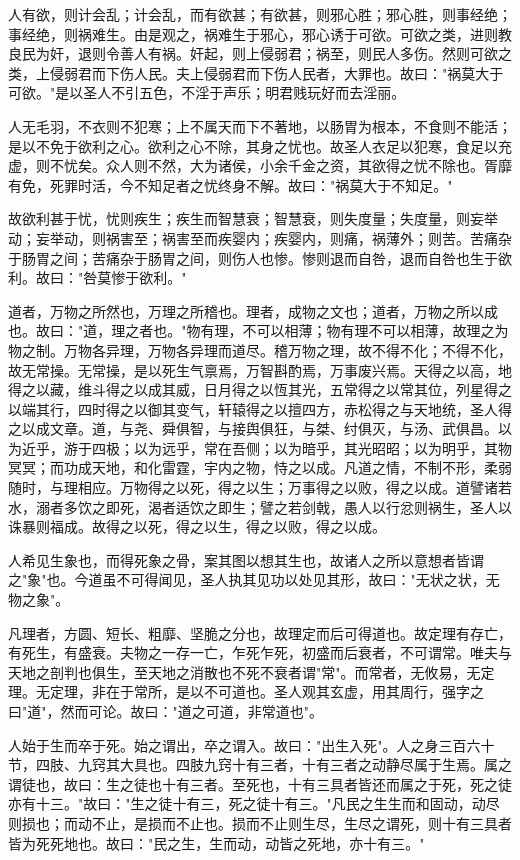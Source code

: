 \documentclass[]{article}
\begin{document}
人有欲，则计会乱；计会乱，而有欲甚；有欲甚，则邪心胜；邪心胜，则事经绝；事经绝，则祸难生。由是观之，祸难生于邪心，邪心诱于可欲。可欲之类，进则教良民为奸，退则令善人有祸。奸起，则上侵弱君；祸至，则民人多伤。然则可欲之类，上侵弱君而下伤人民。夫上侵弱君而下伤人民者，大罪也。故曰："祸莫大于可欲。"是以圣人不引五色，不淫于声乐；明君贱玩好而去淫丽。

人无毛羽，不衣则不犯寒；上不属天而下不著地，以肠胃为根本，不食则不能活；是以不免于欲利之心。欲利之心不除，其身之忧也。故圣人衣足以犯寒，食足以充虚，则不忧矣。众人则不然，大为诸侯，小余千金之资，其欲得之忧不除也。胥靡有免，死罪时活，今不知足者之忧终身不解。故曰："祸莫大于不知足。"

故欲利甚于忧，忧则疾生；疾生而智慧衰；智慧衰，则失度量；失度量，则妄举动；妄举动，则祸害至；祸害至而疾婴内；疾婴内，则痛，祸薄外；则苦。苦痛杂于肠胃之间；苦痛杂于肠胃之间，则伤人也惨。惨则退而自咎，退而自咎也生于欲利。故曰："咎莫惨于欲利。"

道者，万物之所然也，万理之所稽也。理者，成物之文也；道者，万物之所以成也。故曰："道，理之者也。"物有理，不可以相薄；物有理不可以相薄，故理之为物之制。万物各异理，万物各异理而道尽。稽万物之理，故不得不化；不得不化，故无常操。无常操，是以死生气禀焉，万智斟酌焉，万事废兴焉。天得之以高，地得之以藏，维斗得之以成其威，日月得之以恆其光，五常得之以常其位，列星得之以端其行，四时得之以御其变气，轩辕得之以擅四方，赤松得之与天地统，圣人得之以成文章。道，与尧、舜俱智，与接舆俱狂，与桀、纣俱灭，与汤、武俱昌。以为近乎，游于四极；以为远乎，常在吾侧；以为暗乎，其光昭昭；以为明乎，其物冥冥；而功成天地，和化雷霆，宇内之物，恃之以成。凡道之情，不制不形，柔弱随时，与理相应。万物得之以死，得之以生；万事得之以败，得之以成。道譬诸若水，溺者多饮之即死，渴者适饮之即生；譬之若剑戟，愚人以行忿则祸生，圣人以诛暴则福成。故得之以死，得之以生，得之以败，得之以成。

人希见生象也，而得死象之骨，案其图以想其生也，故诸人之所以意想者皆谓之"象"也。今道虽不可得闻见，圣人执其见功以处见其形，故曰："无状之状，无物之象"。

凡理者，方圆、短长、粗靡、坚脆之分也，故理定而后可得道也。故定理有存亡，有死生，有盛衰。夫物之一存一亡，乍死乍死，初盛而后衰者，不可谓常。唯夫与天地之剖判也俱生，至天地之消散也不死不衰者谓"常"。而常者，无攸易，无定理。无定理，非在于常所，是以不可道也。圣人观其玄虚，用其周行，强字之曰"道"，然而可论。故曰："道之可道，非常道也"。

人始于生而卒于死。始之谓出，卒之谓入。故曰："出生入死"。人之身三百六十节，四肢、九窍其大具也。四肢九窍十有三者，十有三者之动静尽属于生焉。属之谓徒也，故曰：生之徒也十有三者。至死也，十有三具者皆还而属之于死，死之徒亦有十三。"故曰："生之徒十有三，死之徒十有三。"凡民之生生而和固动，动尽则损也；而动不止，是损而不止也。损而不止则生尽，生尽之谓死，则十有三具者皆为死死地也。故曰："民之生，生而动，动皆之死地，亦十有三。"
\end{document}

